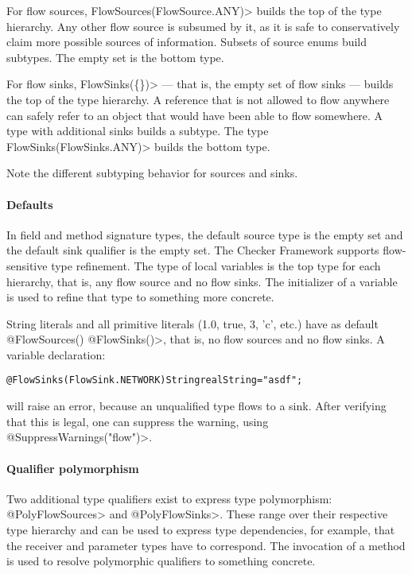 For flow sources, \<FlowSources(FlowSource.ANY)> builds the top of the
type hierarchy. Any other flow source is subsumed by it, as it is safe
to conservatively claim more possible sources of information.
Subsets of source enums build subtypes.
The empty set is the bottom type.


For flow sinks, \<FlowSinks(\{\})> --- that is, the empty set of flow
sinks --- builds the top of the type hierarchy.
A reference that is not allowed to flow anywhere can safely refer to
an object that would have been able to flow somewhere.
A type with additional sinks builds a subtype.
The type \<FlowSinks(FlowSinks.ANY)> builds the bottom type.

Note the different subtyping behavior for sources and sinks.


\paragraph{Defaults}

In field and method signature types, the default source type is the
empty set and the default sink qualifier is the empty set.
The Checker Framework supports flow-sensitive type refinement.
The type of local variables is the top type for each hierarchy, that
is, any flow source and no flow sinks.
The initializer of a variable is used to refine that type to something
more concrete.

String literals and all primitive literals (1.0, true, 3, 'c',
etc.) have as default \<@FlowSources({}) @FlowSinks({})>, that is, no
flow sources and no flow sinks.
A variable declaration:

\begin{alltt}
@FlowSinks(FlowSink.NETWORK) String realString = "asdf";
\end{alltt}

will raise an error, because an unqualified type flows to a sink.
After verifying that this is legal, one can suppress
the warning, using \<@SuppressWarnings("flow")>.


\paragraph{Qualifier polymorphism}

Two additional type qualifiers exist to express type polymorphism:
\<@PolyFlowSources> and \<@PolyFlowSinks>.
These range over their respective type hierarchy and can be used to
express type dependencies, for example, that the receiver and
parameter types have to correspond.
The invocation of a method is used to resolve polymorphic qualifiers
to something concrete.


